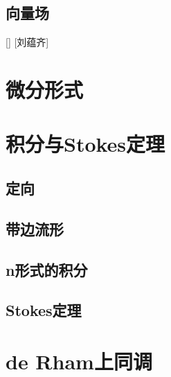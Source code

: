 \documentclass[UTF8]{ctexart}
\begin{document}
    \subsection{向量场}
    
        \begin{dfn}
            []
            {}
            []
            [刘蕴齐]
        \end{dfn}
    
\section{微分形式}

\section{积分与Stokes定理}

    \subsection{定向}

    \subsection{带边流形}

    \subsection{n形式的积分}

    \subsection{Stokes定理}
    
\section{de Rham上同调}

    
\end{document}
